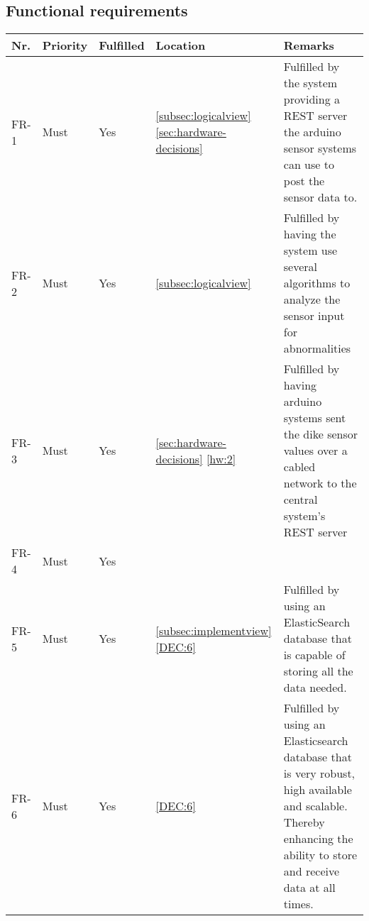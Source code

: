 \subsection{Functional requirements}
\begin{table}[H]
	\begin{tabular}{lllll}
						    
		Nr.   & Priority & Fulfilled & Location & Remarks \\ \hline
		
		FR-1  & Must     & Yes        & \ref{subsec:logicalview} \ref{sec:hardware-decisions} & Fulfilled by the system providing a REST server the arduino sensor systems can use to post the sensor data to. \\ 
		
		FR-2  & Must     & Yes       & \ref{subsec:logicalview}       & Fulfilled by having the system use several algorithms to analyze the sensor input for abnormalities \\ 
		FR-3  & Must     & Yes        & \ref{sec:hardware-decisions} \ref{hw:2}         & Fulfilled by having arduino systems sent the dike sensor values over a cabled network to the central system's REST server \\ 
		
		FR-4  & Must     & Yes        &          & ~       \\ 
		
		FR-5  & Must     & Yes        & \ref{subsec:implementview} \ref{DEC:6} & Fulfilled by using an ElasticSearch database that is capable of storing all the data needed.       \\ 
		
		FR-6  & Must     & Yes & \ref{DEC:6} & Fulfilled by using an Elasticsearch database that is very robust, high available and scalable. Thereby enhancing the ability to store and receive data at all times. \\
		

\end{tabular}
\end{table}
